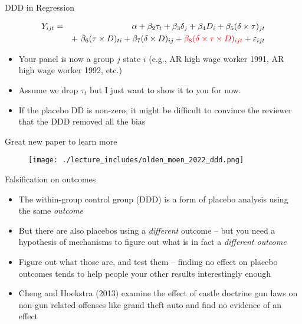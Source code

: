 \documentclass{beamer}
\begin{document}
\begin{frame}{DDD in Regression}
	
	\begin{eqnarray*}
	Y_{ijt} &=&\alpha +  \beta_2 \tau_t + \beta_3 \delta_j  + \beta_4 D_i + \beta_5(\delta \times \tau)_{jt} \\
	&& +\ \beta_6(\tau \times D)_{ti} +  \beta_7(\delta \times D)_{ij} +  \textcolor{red}{\beta_8(\delta \times \tau \times  D)_{ijt}}+  \varepsilon_{ijt}
	\end{eqnarray*}
	
	\begin{itemize}
	\item Your panel is now a group $j$ state $i$ (e.g., AR high wage worker 1991, AR high wage worker 1992, etc.)
	\item Assume we drop $\tau_t$ but I just want to show it to you for now.
	\item If the placebo DD is non-zero, it might be difficult to convince the reviewer that the DDD removed all the bias 
	\end{itemize}
	
\end{frame}

\begin{frame}{Great new paper to learn more}

\begin{figure}
\texttt{[image: ./lecture\_includes/olden\_moen\_2022\_ddd.png]}
\end{figure}

\end{frame}




\begin{frame}{Falsification on outcomes}
	
	\begin{itemize}
	\item The within-group control group (DDD) is a form of placebo analysis using the same \emph{outcome}
	\item But there are also placebos using a \emph{different} outcome -- but you need a hypothesis of mechanisms to figure out what is in fact a \emph{different outcome}
	\item Figure out what those are, and test them -- finding no effect on placebo outcomes tends to help people your other results interestingly enough
	\item Cheng and Hoekstra (2013) examine the effect of castle doctrine gun laws on non-gun related offenses like grand theft auto and find no evidence of an effect 
	\end{itemize}
\end{frame}
\end{document}
